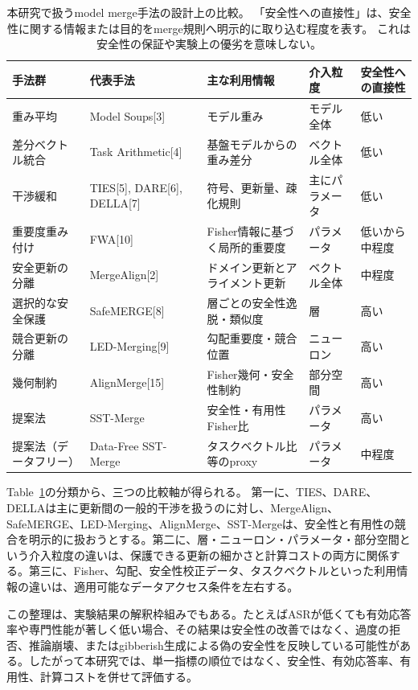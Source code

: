 \begin{table}[t]
\centering
\caption{本研究で扱うmodel merge手法の設計上の比較。
「安全性への直接性」は、安全性に関する情報または目的をmerge規則へ明示的に取り込む程度を表す。
これは安全性の保証や実験上の優劣を意味しない。}
\label{tab:method-comparison-revised}
\small
\begin{tabular}{p{2.3cm}p{2.7cm}p{3.0cm}p{2.0cm}p{2.6cm}}
\toprule
手法群 & 代表手法 & 主な利用情報 & 介入粒度 & 安全性への直接性 \\
\midrule
重み平均 &
Model Soups[3] &
モデル重み &
モデル全体 &
低い \\
差分ベクトル統合 &
Task Arithmetic[4] &
基盤モデルからの重み差分 &
ベクトル全体 &
低い \\
干渉緩和 &
TIES[5], DARE[6], DELLA[7] &
符号、更新量、疎化規則 &
主にパラメータ &
低い \\
重要度重み付け &
FWA[10] &
Fisher情報に基づく局所的重要度 &
パラメータ &
低いから中程度 \\
安全更新の分離 &
MergeAlign[2] &
ドメイン更新とアライメント更新 &
ベクトル全体 &
中程度 \\
選択的な安全保護 &
SafeMERGE[8] &
層ごとの安全性逸脱・類似度 &
層 &
高い \\
競合更新の分離 &
LED-Merging[9] &
勾配重要度・競合位置 &
ニューロン &
高い \\
幾何制約 &
AlignMerge[15] &
Fisher幾何・安全性制約 &
部分空間 &
高い \\
提案法 &
SST-Merge &
安全性・有用性Fisher比 &
パラメータ &
高い \\
提案法（データフリー） &
Data-Free SST-Merge &
タスクベクトル比等のproxy &
パラメータ &
中程度 \\
\bottomrule
\end{tabular}
\end{table}

Table~\ref{tab:method-comparison-revised}の分類から、三つの比較軸が得られる。
第一に、TIES、DARE、DELLAは主に更新間の一般的干渉を扱うのに対し、MergeAlign、SafeMERGE、LED-Merging、AlignMerge、SST-Mergeは、安全性と有用性の競合を明示的に扱おうとする。第二に、層・ニューロン・パラメータ・部分空間という介入粒度の違いは、保護できる更新の細かさと計算コストの両方に関係する。第三に、Fisher、勾配、安全性校正データ、タスクベクトルといった利用情報の違いは、適用可能なデータアクセス条件を左右する。

この整理は、実験結果の解釈枠組みでもある。たとえばASRが低くても有効応答率や専門性能が著しく低い場合、その結果は安全性の改善ではなく、過度の拒否、推論崩壊、またはgibberish生成による偽の安全性を反映している可能性がある。したがって本研究では、単一指標の順位ではなく、安全性、有効応答率、有用性、計算コストを併せて評価する。


